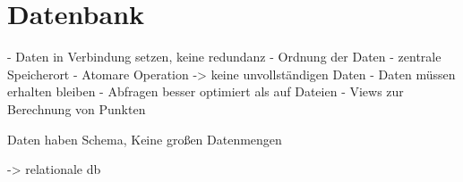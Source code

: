 \section{Datenbank}
- Daten in Verbindung setzen, keine redundanz
- Ordnung der Daten
- zentrale Speicherort
- Atomare Operation -> keine unvollständigen Daten
- Daten müssen erhalten bleiben
- Abfragen besser optimiert als auf Dateien
- Views zur Berechnung von Punkten

Daten haben Schema, Keine großen Datenmengen

-> relationale db